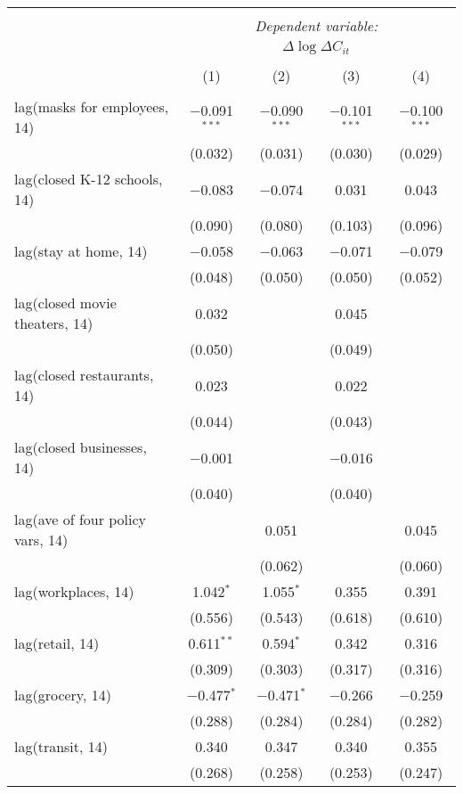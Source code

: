 \begin{tabular}{@{\extracolsep{1pt}}lcccc} 
\\[-1.8ex]\hline 
\hline \\[-1.8ex] 
 & \multicolumn{4}{c}{\textit{Dependent variable:}} \\ 
\cline{2-5} 
 & \multicolumn{4}{c}{$\Delta \log \Delta C_{it}$} \\ 
\\[-1.8ex] & (1) & (2) & (3) & (4)\\ 
\hline \\[-1.8ex] 
 lag(masks for employees, 14) & $-$0.091$^{***}$ & $-$0.090$^{***}$ & $-$0.101$^{***}$ & $-$0.100$^{***}$ \\ 
  & (0.032) & (0.031) & (0.030) & (0.029) \\ 
  lag(closed K-12 schools, 14) & $-$0.083 & $-$0.074 & 0.031 & 0.043 \\ 
  & (0.090) & (0.080) & (0.103) & (0.096) \\ 
  lag(stay at home, 14) & $-$0.058 & $-$0.063 & $-$0.071 & $-$0.079 \\ 
  & (0.048) & (0.050) & (0.050) & (0.052) \\ 
  lag(closed movie theaters, 14) & 0.032 &  & 0.045 &  \\ 
  & (0.050) &  & (0.049) &  \\ 
  lag(closed restaurants, 14) & 0.023 &  & 0.022 &  \\ 
  & (0.044) &  & (0.043) &  \\ 
  lag(closed businesses, 14) & $-$0.001 &  & $-$0.016 &  \\ 
  & (0.040) &  & (0.040) &  \\ 
  lag(ave of four policy vars, 14) &  & 0.051 &  & 0.045 \\ 
  &  & (0.062) &  & (0.060) \\ 
  lag(workplaces, 14) & 1.042$^{*}$ & 1.055$^{*}$ & 0.355 & 0.391 \\ 
  & (0.556) & (0.543) & (0.618) & (0.610) \\ 
  lag(retail, 14) & 0.611$^{**}$ & 0.594$^{*}$ & 0.342 & 0.316 \\ 
  & (0.309) & (0.303) & (0.317) & (0.316) \\ 
  lag(grocery, 14) & $-$0.477$^{*}$ & $-$0.471$^{*}$ & $-$0.266 & $-$0.259 \\ 
  & (0.288) & (0.284) & (0.284) & (0.282) \\ 
  lag(transit, 14) & 0.340 & 0.347 & 0.340 & 0.355 \\ 
  & (0.268) & (0.258) & (0.253) & (0.247) \\ 

\end{tabular}
